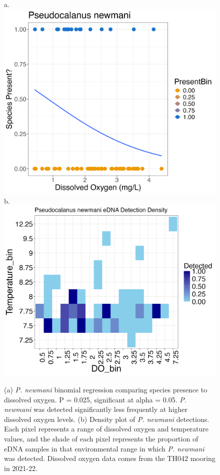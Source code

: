 \documentclass[12pt,twoside]{reedthesis}
\begin{document}
	\begin{figure}[!h]
		\begin{center}
			a. \includegraphics[scale=0.3]{Pnewmani_binom_sig_neg}
			b. \includegraphics[scale=0.3]{Pnewmani_Density}
			\caption[\textit{P. newmani} binomial regressions]{\footnotesize{(a) \textit{P. newmani} binomial regression comparing species presence to dissolved oxygen. P = 0.025, significant at alpha = 0.05. \textit{P. newmani} was detected significantly less frequently at higher dissolved oxygen levels. (b) Density plot of \textit{P. newmani} detections. Each pixel represents a range of dissolved oxygen and temperature values, and the shade of each pixel represents the proportion of eDNA samples in that environmental range in which \textit{P. newmani} was detected. Dissolved oxygen data comes from the TH042 mooring in 2021-22.}} %
			\label{PnewmaniBinomDensity}
		\end{center}
	\end{figure} 
	
\end{document}
